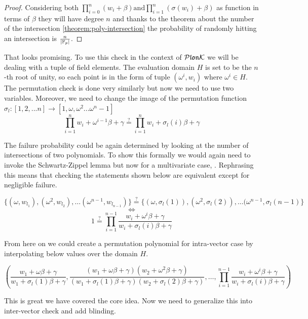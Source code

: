 \begin{proof}
    Considering both $\prod_{i=0}^n (w_i + \beta) \text{and} \prod_{i=1}^n (\sigma(w_i) + \beta)$ as function in terms of $\beta$ they will have degree $n$ and thanks to the theorem about the number of the intersection \cref{theorem:poly-intersection} the probability of randomly hitting an intersection is $\frac{n}{|\mathbb{F}_p|}$.
\end{proof}

That looks promising. To use this check in the context of $\mathcal{P}\mathfrak{lon}\mathcal{K}$ we will be dealing with a tuple of field elements. The evaluation domain $H$ is set to be the $n$-th root of unity, so each point is in the form of tuple $(\omega^{i}, w_i)$ where $\omega^i \in H$. The permutation check is done very similarly but now we need to use two variables. Moreover, we need to change the image of the permutation function $\sigma_l: [1, 2, ... n] \rightarrow [1, \omega, \omega^2 ... \omega^n-1]$
$$\prod_{i = 1}^{n} w_i + \omega^{i-1} \beta + \gamma \stackrel{?}{=} \prod_{i = 1}^{n} w_i + \sigma_l(i) \beta + \gamma$$ 


The failure probability could be again determined by looking at the number of intersections of two polynomials. To show this formally we would again need to invoke the Schwartz-Zippel lemma but now for a multivariate case, \cite{MultivariateSZLemma}. Rephrasing this means that checking the statements shown below are equivalent except for negligible failure.

$$\{(\omega, w_{l_1}), (\omega^2, w_{l_2}), \ldots (\omega^{n-1}, w_{l_{n-1}})\} \stackrel{?}{=} \{(\omega, \sigma_l(1)), (\omega^2, \sigma_l(2)), \ldots (\omega^{n-1}, \sigma_l(n-1)\}$$
$$\iff$$
$$ 1 \stackrel{?}{=} \prod_{i = 1}^{n-1} \frac{w_i + \omega^i \beta + \gamma}{w_i + \sigma_l(i) \beta + \gamma}$$

From here on we could create a permutation polynomial for intra-vector case by interpolating below values over the domain $H$.

\begin{equation}
    \label{eq:intra-interpolation}
    (\frac{w_1 + \omega \beta + \gamma}{w_1 + \sigma_l(1) \beta + \gamma},
    \frac{(w_1 +  \omega \beta + \gamma)(w_2 + \omega^2 \beta + \gamma)}{(w_1 + \sigma_l(1) \beta + \gamma)(w_2 + \sigma_l(2) \beta + \gamma)}, \ldots,
    \prod_{i = 1}^{n-1} \frac{w_i + \omega^i \beta + \gamma}{w_i + \sigma_l(i) \beta + \gamma})
\end{equation}

This is great we have covered the core idea. Now we need to generalize this into inter-vector check and add blinding.

